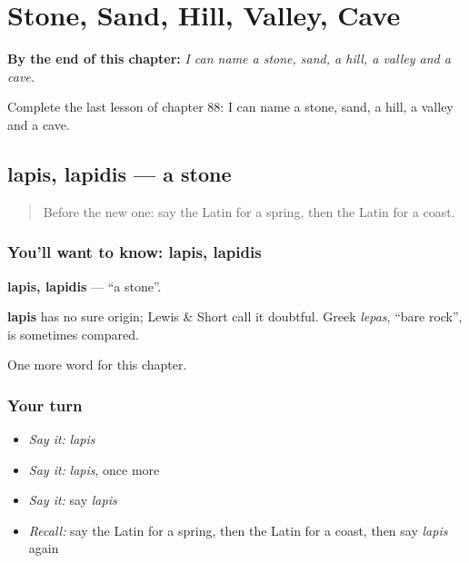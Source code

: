 
\chapter{Stone, Sand, Hill, Valley, Cave}
\label{ch:la-stone-sand-hill-valley-cave}

\begin{chapteropening}
\textbf{By the end of this chapter:} \emph{I can name a stone, sand, a hill, a valley and a cave.}

Complete the last lesson of chapter 88: I can name a stone, sand, a hill, a valley and a cave.
\end{chapteropening}

\section[lapis, lapidis]{lapis, lapidis — a stone}

\label{lesson:LA-C88-lapis}



\begin{quote}
Before the new one: say the Latin for a spring, then the Latin for a coast.
\end{quote}

\subsection*{You'll want to know: lapis, lapidis}
\textbf{lapis, lapidis} — \textquotedblleft{}a stone\textquotedblright{}.

\begin{cousinweb}
\textbf{lapis} has no sure origin; Lewis \& Short call it doubtful. Greek \emph{lepas}, \textquotedblleft{}bare rock\textquotedblright{}, is sometimes compared.
\end{cousinweb}

\begin{grammarlens}[title={What you've built}]
One more word for this chapter.
\end{grammarlens}

\subsection*{Your turn}
\begin{itemize}
\raggedright
  \item \emph{Say it:} \emph{lapis}
  \item \emph{Say it:} \emph{lapis}, once more
  \item \emph{Say it:} say \emph{lapis}
  \item \emph{Recall:} say the Latin for a spring, then the Latin for a coast, then say \emph{lapis} again
\end{itemize}


